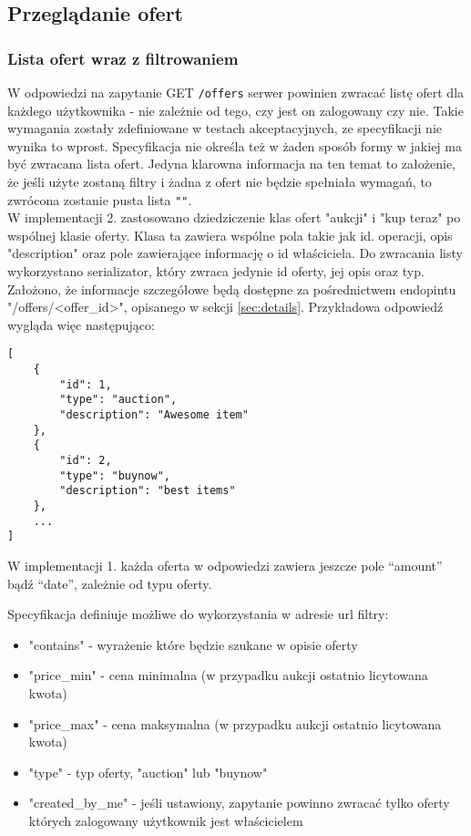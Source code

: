 \documentclass[12pt, notitlepage]{article}
\begin{document}
\subsection{Przeglądanie ofert}
\subsubsection{Lista ofert wraz z filtrowaniem}\label{sec:search}
W odpowiedzi na zapytanie GET \texttt{/offers} serwer powinien zwracać listę ofert dla każdego użytkownika - nie zależnie od tego, czy jest on zalogowany czy nie. Takie wymagania zostały zdefiniowane w testach akceptacyjnych, ze specyfikacji nie wynika to wprost. Specyfikacja nie określa też w żaden sposób formy w jakiej ma być zwracana lista ofert. Jedyna klarowna informacja na ten temat to założenie, że jeśli użyte zostaną filtry i żadna z ofert nie będzie spełniała wymagań, to zwrócona zostanie pusta lista \texttt{"\lbrack\rbrack"}. \\

W implementacji 2. zastosowano dziedziczenie klas ofert "aukcji" i "kup teraz" po wspólnej klasie oferty. Klasa ta zawiera wspólne pola takie jak id. operacji, opis "description" oraz pole zawierające informację o id właściciela. Do zwracania listy wykorzystano serializator, który zwraca jedynie id oferty, jej opis oraz typ. Założono, że informacje szczegółowe będą dostępne za pośrednictwem endopintu "/offers/<offer\_id>", opisanego w sekcji \ref{sec:details}. Przykładowa odpowiedź wygląda więc następująco:
\begin{lstlisting}
[
    {     
        "id": 1,
        "type": "auction",
        "description": "Awesome item"
    },
    {
        "id": 2,
        "type": "buynow",
        "description": "best items"
    },
    ...
]	
\end{lstlisting}
W implementacji 1. każda oferta w odpowiedzi zawiera jeszcze pole ``amount'' bądź ``date'', zależnie od typu oferty.

Specyfikacja definiuje możliwe do wykorzystania w adresie url filtry:
\begin{itemize}
    \item "contains" - wyrażenie które będzie szukane w opisie oferty
    \item "price\_min" - cena minimalna (w przypadku aukcji ostatnio licytowana kwota)
    \item "price\_max" - cena maksymalna (w przypadku aukcji ostatnio licytowana kwota)
    \item "type" - typ oferty, "auction" lub "buynow"
    \item "created\_by\_me" - jeśli ustawiony, zapytanie powinno zwracać tylko oferty których zalogowany użytkownik jest właścicielem
\end{itemize}
\end{document}
